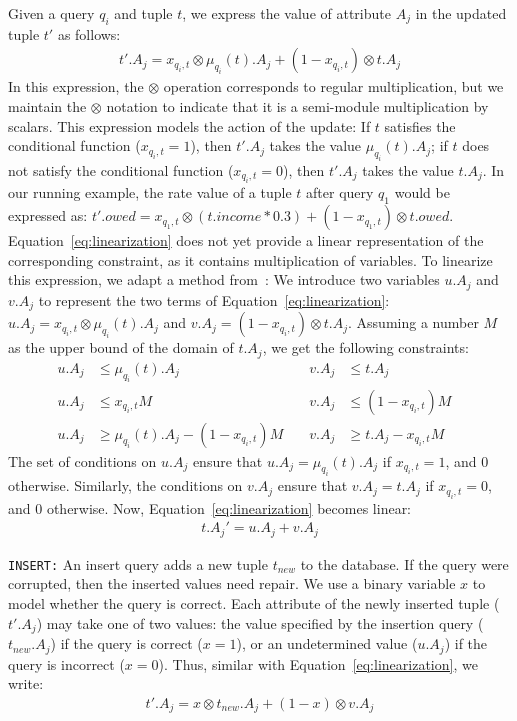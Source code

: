Given a query $q_i$ and tuple $t$, we express the value of attribute $A_j$ in the updated tuple $t'$ as follows:
{\scriptsize
\begin{align}
\label{eq:linearization}
t'.A_j = x_{q_i, t}\otimes \mu_{q_i}(t).A_j + (1-x_{q_i, t})\otimes t.A_j 
\end{align} 
}
In this expression, the $\otimes$ operation corresponds to regular
multiplication, but we maintain the $\otimes$ notation to indicate
that it is a semi-module multiplication by scalars. This expression
models the action of the update: If $t$ satisfies the conditional
function ($x_{q_i, t}=1$), then $t'.A_j$ takes the value
$\mu_{q_i}(t).A_j$; if $t$ does not satisfy the conditional function
($x_{q_i, t}=0$), then $t'.A_j$ takes the value $t.A_j$.
In our running example, the rate value of a tuple $t$ after query $q_1$ would be expressed as:
$t'.owed = x_{q_1, t}\otimes (t.income*0.3) + (1-x_{q_1, t})\otimes t.owed$.
Equation~\eqref{eq:linearization} does not yet provide a linear
representation of the corresponding constraint, as it contains
multiplication of variables. To linearize this expression, we adapt a
method from~\cite{tiresias}: We introduce two variables $u.A_j$ and
$v.A_j$ to represent the two terms of
Equation~\eqref{eq:linearization}: $u.A_j=x_{q_i, t}\otimes
\mu_{q_i}(t).A_j$ and $v.A_j=(1-x_{q_i, t})\otimes t.A_j$. Assuming a
number $M$ as the upper bound of the domain of $t.A_j$, we get the
following constraints:
{\scriptsize
\begin{align}
\label{eq:uv}
u.A_j &\leq \mu_{q_i}(t).A_j   &v.A_j &\leq t.A_j &\nonumber\\
u.A_j &\leq x_{q_i, t}M        &v.A_j &\leq (1-x_{q_i, t})M &\\
u.A_j &\geq \mu_{q_i}(t).A_j - (1-x_{q_i, t})M  \phantom{aa}
&v.A_j &\geq t.A_j - x_{q_i, t}M &\nonumber
\end{align}
}
The set of conditions on $u.A_j$ ensure that $u.A_j = \mu_{q_i}(t).A_j$ if $x_{q_i, t}=1$, and $0$ otherwise. Similarly, 
the conditions on $v.A_j$ ensure that $v.A_j = t.A_j$ if $x_{q_i, t}=0$, and $0$ otherwise.  
Now, Equation~\eqref{eq:linearization} becomes linear:
 {\scriptsize
\begin{align}
\label{eq:tnew}
t.A_j' = u.A_j + v.A_j
\end{align}
}

\vspace*{-0.1in}
\noindent\texttt{INSERT:}
An insert query adds a new tuple $t_{new}$ to the database.  If the query were 
corrupted, then the inserted values need repair. We use a binary variable $x$ to model whether the query is correct.  Each attribute of the newly inserted tuple ($t'.A_j$) may take one of two values: the value specified by the insertion query ($t_{new}.A_j$) if the query is correct ($x=1$), or an undetermined value ($u.A_j$) if the query is incorrect ($x=0$).  Thus, similar with Equation~\eqref{eq:linearization}, we write:
 {\scriptsize
\begin{eqnarray}
\label{eq:insert}
t'.A_j = x \otimes t_{new}.A_j + (1-x) \otimes v.A_j 
\end{eqnarray}
 }



